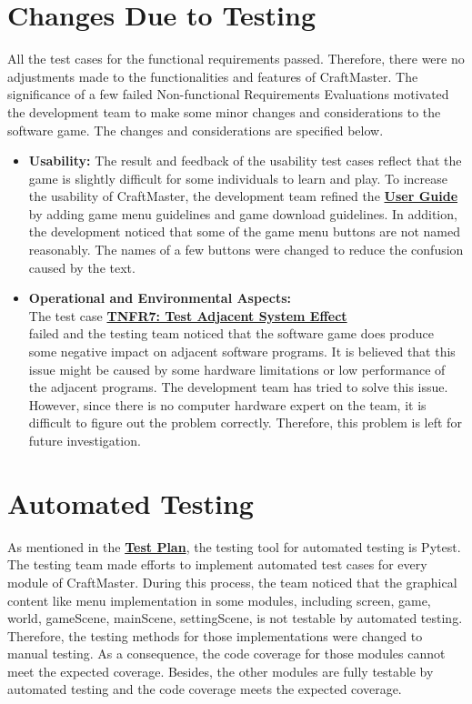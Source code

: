 \documentclass[12pt, titlepage]{article}
\begin{document}
\section{Changes Due to Testing}
All the test cases for the functional requirements passed. Therefore, there were no adjustments made to the functionalities and features of CraftMaster. The significance of a few failed Non-functional Requirements Evaluations motivated the development team to make some minor changes and considerations to the software game. The changes and considerations are specified below.
\begin{itemize}
    \item \textbf{Usability: }The result and feedback of the usability test cases reflect that the game is slightly difficult for some individuals to learn and play. To increase the usability of CraftMaster, the development team refined the \href{https://gitlab.cas.mcmaster.ca/wangs132/minecraft/-/blob/master/Doc/UserGuide/UserGuide.pdf}{\bf User Guide} by adding game menu guidelines and game download guidelines. In addition, the development noticed that some of the game menu buttons are not named reasonably. The names of a few buttons were changed to reduce the confusion caused by the text.
    \item \textbf{Operational and Environmental Aspects: }\\ The test case \hyperref[adjacent]{\textbf{TNFR7: Test Adjacent System Effect\\}} failed and the testing team noticed that the software game does produce some negative impact on adjacent software programs. It is believed that this issue might be caused by some hardware limitations or low performance of the adjacent programs. The development team has tried to solve this issue. However, since there is no computer hardware expert on the team, it is difficult to figure out the problem correctly. Therefore, this problem is left for future investigation.
\end{itemize}
\section{Automated Testing}\label{auto}
As mentioned in the \href{https://gitlab.cas.mcmaster.ca/wangs132/minecraft/-/blob/master/Doc/TestPlan/TestPlan.pdf}{\bf Test Plan}, the testing tool for automated testing is Pytest. The testing team made efforts to implement automated test cases for every module of CraftMaster. During this process, the team noticed that the graphical content like menu implementation in some modules, including screen, game, world, gameScene, mainScene, settingScene, is not testable by automated testing. Therefore, the testing methods for those implementations were changed to manual testing. As a consequence, the code coverage for those modules cannot meet the expected coverage. Besides, the other modules are fully testable by automated testing and the code coverage meets the expected coverage.
\end{document}
